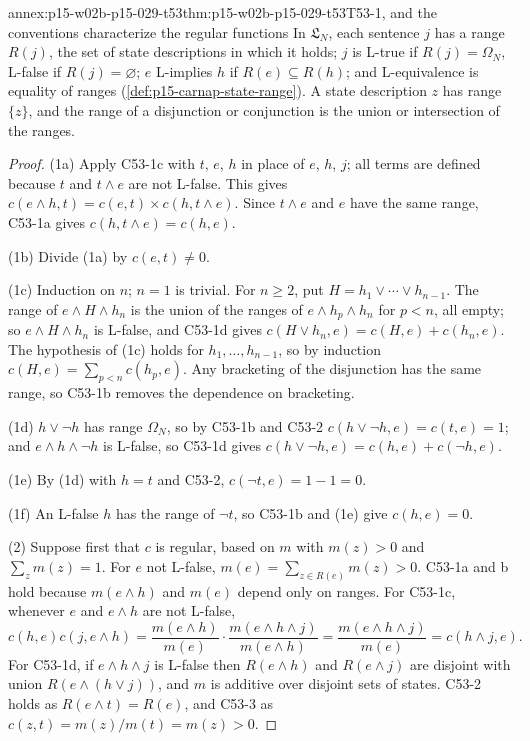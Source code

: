 \begin{annexitem}{annex:p15-w02b-p15-029-t53}{thm:p15-w02b-p15-029-t53}{T53-1, and the conventions characterize the regular functions}
In \(\mathfrak L_N\), each sentence \(j\) has a range \(R(j)\), the set
of state descriptions in which it holds; \(j\) is L-true if
\(R(j)=\Omega_N\), L-false if \(R(j)=\varnothing\); \(e\) L-implies
\(h\) if \(R(e)\subseteq R(h)\); and L-equivalence is equality of
ranges (\cref{def:p15-carnap-state-range}). A state description \(z\)
has range \(\{z\}\), and the range of a disjunction or conjunction is
the union or intersection of the ranges.
\begin{proof}
(1a) Apply C53-1c with \(t\), \(e\), \(h\) in place of \(e\), \(h\),
\(j\); all terms are defined because \(t\) and \(t\land e\) are not
L-false. This gives \(c(e\land h,t)=c(e,t)\times c(h,t\land e)\). Since
\(t\land e\) and \(e\) have the same range, C53-1a gives
\(c(h,t\land e)=c(h,e)\).

(1b) Divide (1a) by \(c(e,t)\ne0\).

(1c) Induction on \(n\); \(n=1\) is trivial. For \(n\geq2\), put
\(H=h_1\lor\cdots\lor h_{n-1}\). The range of \(e\land H\land h_n\) is
the union of the ranges of \(e\land h_p\land h_n\) for \(p<n\), all
empty; so \(e\land H\land h_n\) is L-false, and C53-1d gives
\(c(H\lor h_n,e)=c(H,e)+c(h_n,e)\). The hypothesis of (1c) holds for
\(h_1,\ldots,h_{n-1}\), so by induction \(c(H,e)=\sum_{p<n}c(h_p,e)\).
Any bracketing of the disjunction has the same range, so C53-1b
removes the dependence on bracketing.

(1d) \(h\lor\neg h\) has range \(\Omega_N\), so by C53-1b and C53-2
\(c(h\lor\neg h,e)=c(t,e)=1\); and \(e\land h\land\neg h\) is
L-false, so C53-1d gives \(c(h\lor\neg h,e)=c(h,e)+c(\neg h,e)\).

(1e) By (1d) with \(h=t\) and C53-2, \(c(\neg t,e)=1-1=0\).

(1f) An L-false \(h\) has the range of \(\neg t\), so C53-1b and (1e)
give \(c(h,e)=0\).

(2) Suppose first that \(c\) is regular, based on \(m\) with
\(m(z)>0\) and \(\sum_zm(z)=1\). For \(e\) not L-false,
\(m(e)=\sum_{z\in R(e)}m(z)>0\). C53-1a and b hold because
\(m(e\land h)\) and \(m(e)\) depend only on ranges. For C53-1c,
whenever \(e\) and \(e\land h\) are not L-false,
\[
 c(h,e)c(j,e\land h)=\frac{m(e\land h)}{m(e)}\cdot
 \frac{m(e\land h\land j)}{m(e\land h)}=\frac{m(e\land h\land j)}{m(e)}
 =c(h\land j,e).
\]
For C53-1d, if \(e\land h\land j\) is L-false then
\(R(e\land h)\) and \(R(e\land j)\) are disjoint with union
\(R(e\land(h\lor j))\), and \(m\) is additive over disjoint sets of
states. C53-2 holds as \(R(e\land t)=R(e)\), and C53-3 as
\(c(z,t)=m(z)/m(t)=m(z)>0\).


\end{proof}
\end{annexitem}

